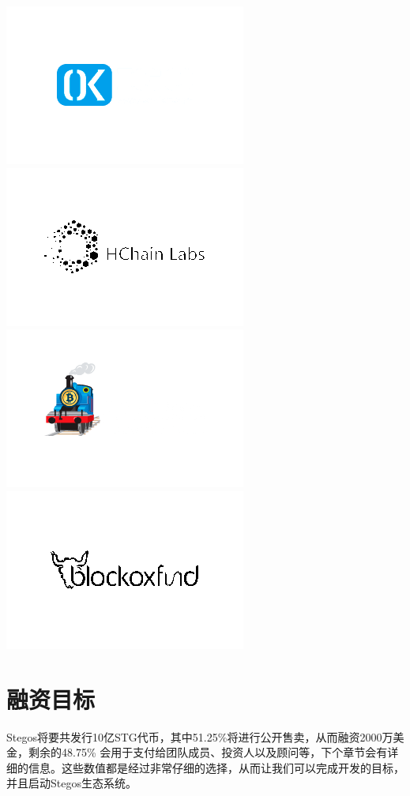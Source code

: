 \documentclass[8pt,fleqn,openany]{book}
\begin{document}
\begin{CJK*}{UTF8}{gbsn}
{{\begin{multicols}{7}[\columnsep=1cm]
	\columnbreak
	\includegraphics[scale=\imgscale]{images/partners/partners-4.png}
	\columnbreak
	\includegraphics[scale=\imgscale]{images/partners/partners-5.png}
	\columnbreak
	\includegraphics[scale=\imgscale]{images/partners/partners-6.png}
	\columnbreak
	\includegraphics[scale=\imgscale]{images/partners/partners-7.png}
\end{multicols}
}

\section{融资目标}
Stegos将要共发行10亿STG代币，其中51.25\%将进行公开售卖，从而融资2000万美金，剩余的48.75\% 会用于支付给团队成员、投资人以及顾问等，下个章节会有详细的信息。这些数值都是经过非常仔细的选择，从而让我们可以完成开发的目标，并且启动Stegos生态系统。

}
\end{CJK*}
\end{document}
